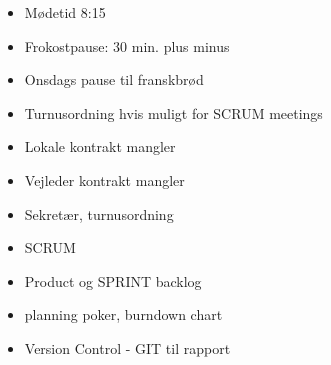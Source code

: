 \documentclass[10pt,a4paper]{letter}
\begin{document}
\begin{itemize}
     \item Mødetid 8:15
     \item Frokostpause: 30 min. plus minus
     \item Onsdags pause til franskbrød
     \item Turnusordning hvis muligt for SCRUM meetings
     \item Lokale kontrakt mangler
     \item Vejleder kontrakt mangler
     \item Sekretær, turnusordning
     \item SCRUM
     \item Product og SPRINT backlog
     \item planning poker, burndown chart
     \item Version Control - GIT til rapport
\end{itemize}
\end{document}
